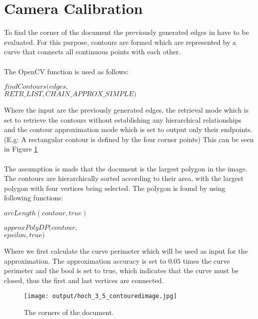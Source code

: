 \documentclass[twocolumn,10pt]{asme2ej}
\begin{document}
\section{Camera Calibration}
\noindent
To find the corner of the document the previously generated edges 
in  have to be evaluated.
For this purpose, contours are formed which are represented by a curve that connects all 
continuous points with each other\cite{SUZUKI198532}.\\\\
\noindent
The OpenCV function\cite{opencv_findcontours} is used as follows:
\begin{center}
    \noindent
    $findContours(edges,$\\
    $RETR\_LIST, CHAIN\_APPROX\_SIMPLE)$
\end{center}
\noindent
Where the input are the previously generated edges, the retrieval 
mode\cite{opencv_retrievalmode} which is 
set to retrieve the contours without establishing any hierarchical relationships 
and the contour approximation mode\cite{opencv_approxmode} which is set to output only their endpoints.
(E.g: A rectangular contour is defined by the four corner points)
This can be seen in Figure \ref{fig:contours}\\\\
\noindent
The assumption is made that the document is the largest polygon in the image.
The contours are hierarchically sorted according to their area, with the largest polygon with four vertices being selected\cite{RAMER1972244}\cite{doi:10.3138/FM57-6770-U75U-7727}.
The polygon is found by using following functions\cite{opencv_approxpoly}\cite{opencv_arclength}:

\begin{center}
    \noindent
    $arcLength(contour,true)$
\end{center}

\begin{center}
    \noindent
    $approxPolyDP(contour,$\\
    $epsilon, true)$
\end{center}
\noindent
Where we first calculate the curve perimeter which will be used as 
input for the approximation. 
The approximation accuracy is set to $0.05$ times the curve perimeter and 
the bool is set to true, which indicates that the curve must be closed, thus the first and last vertices are connected.


\begin{figure}[H]
\centerline{\texttt{[image: output/hoch\_3\_5\_contouredimage.jpg]}}
\caption{The corners of the document.}
\label{fig:contours}
\end{figure}
\end{document}
